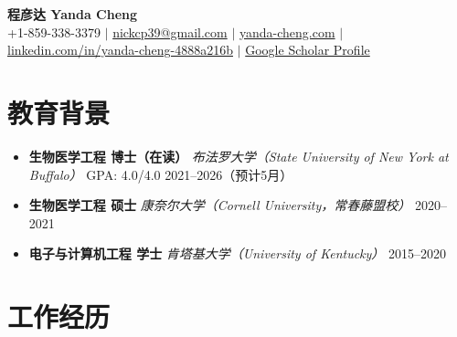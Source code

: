 \documentclass[letterpaper,10pt]{article}
\begin{document}



\begin{center}
  {\huge \textbf{程彦达 \quad Yanda Cheng}} \\
  \vspace{4pt}
  \small
  +1-859-338-3379 \quad$|$\quad
  \href{mailto:nickcp39@gmail.com}{nickcp39@gmail.com} \quad$|$\quad
  \href{https://yanda-cheng.com}{yanda-cheng.com} \quad$|$\quad
  \href{https://www.linkedin.com/in/yanda-cheng-4888a216b}{linkedin.com/in/yanda-cheng-4888a216b} \quad$|$\quad
  \href{https://scholar.google.com/citations?view_op=search_authors&mauthors=Yanda+Cheng+University+at+Buffalo}{Google Scholar Profile}
\end{center}

\vspace{-2pt}

\section{教育背景}

\begin{itemize}[leftmargin=0.0in, label={}, itemsep=3pt, topsep=2pt]
  \item
    \textbf{生物医学工程 博士（在读）}\hfill
    \textit{布法罗大学（State University of New York at Buffalo）}\hfill
    GPA: 4.0/4.0 \hfill 2021--2026（预计5月）
  \item
    \textbf{生物医学工程 硕士}\hfill
    \textit{康奈尔大学（Cornell University，常春藤盟校）}\hfill
    2020--2021
  \item
    \textbf{电子与计算机工程 学士}\hfill
    \textit{肯塔基大学（University of Kentucky）}\hfill
    2015--2020
\end{itemize}

\vspace{-2pt}

\section{工作经历}
\end{document}

